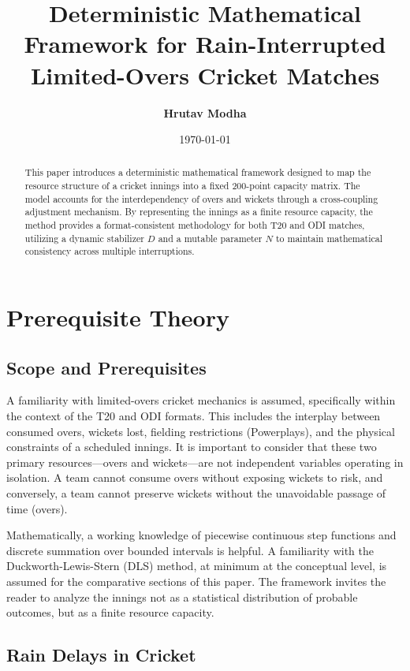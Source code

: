 \documentclass[12pt, letterpaper, fleqn]{article}
\title{\Huge \textbf{Deterministic Mathematical Framework for Rain-Interrupted Limited-Overs Cricket Matches}}
\author{\Large \textbf{Hrutav Modha}}
\date{\today}
\begin{document}
\maketitle

\begin{abstract}
\indent This paper introduces a deterministic mathematical framework designed to map the resource structure of a cricket innings into a fixed 200-point capacity matrix. The model accounts for the interdependency of overs and wickets through a cross-coupling adjustment mechanism. By representing the innings as a finite resource capacity, the method provides a format-consistent methodology for both T20 and ODI matches, utilizing a dynamic stabilizer $D$ and a mutable parameter $N$ to maintain mathematical consistency across multiple interruptions.
\end{abstract}

\newpage
\tableofcontents
\newpage

\section{Prerequisite Theory}

\subsection{Scope and Prerequisites}

\indent A familiarity with limited-overs cricket mechanics is assumed, specifically within the context of the T20 and ODI formats. This includes the interplay between consumed overs, wickets lost, fielding restrictions (Powerplays), and the physical constraints of a scheduled innings. It is important to consider that these two primary resources---overs and wickets---are not independent variables operating in isolation. A team cannot consume overs without exposing wickets to risk, and conversely, a team cannot preserve wickets without the unavoidable passage of time (overs). 

\indent Mathematically, a working knowledge of piecewise continuous step functions and discrete summation over bounded intervals is helpful. A familiarity with the Duckworth-Lewis-Stern (DLS) method, at minimum at the conceptual level, is assumed for the comparative sections of this paper. The framework invites the reader to analyze the innings not as a statistical distribution of probable outcomes, but as a finite resource capacity.

\subsection{Rain Delays in Cricket}
\end{document}
